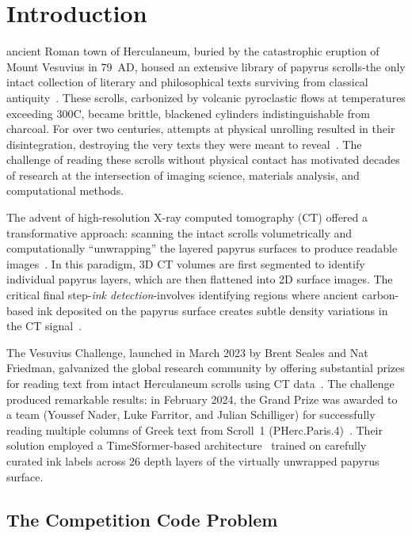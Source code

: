 \section{Introduction}
\label{sec:introduction}

 ancient Roman town of Herculaneum, buried by the catastrophic eruption of Mount Vesuvius in 79~AD, housed an extensive library of papyrus scrolls-the only intact collection of literary and philosophical texts surviving from classical antiquity~\cite{parsons1936}. These scrolls, carbonized by volcanic pyroclastic flows at temperatures exceeding 300\textdegree C, became brittle, blackened cylinders indistinguishable from charcoal. For over two centuries, attempts at physical unrolling resulted in their disintegration, destroying the very texts they were meant to reveal~\cite{janko2002herculaneum}. The challenge of reading these scrolls without physical contact has motivated decades of research at the intersection of imaging science, materials analysis, and computational methods.

The advent of high-resolution X-ray computed tomography (CT) offered a transformative approach: scanning the intact scrolls volumetrically and computationally ``unwrapping'' the layered papyrus surfaces to produce readable images~\cite{seales2005digital, seales2023educelab}. In this paradigm, 3D CT volumes are first segmented to identify individual papyrus layers, which are then flattened into 2D surface images. The critical final step-\emph{ink detection}-involves identifying regions where ancient carbon-based ink deposited on the papyrus surface creates subtle density variations in the CT signal~\cite{mocella2015revealing, liu2024ink}.

The Vesuvius Challenge, launched in March 2023 by Brent Seales and Nat Friedman, galvanized the global research community by offering substantial prizes for reading text from intact Herculaneum scrolls using CT data~\cite{vesuvius2023challenge}. The challenge produced remarkable results: in February 2024, the Grand Prize was awarded to a team (Youssef Nader, Luke Farritor, and Julian Schilliger) for successfully reading multiple columns of Greek text from Scroll~1 (PHerc.Paris.4)~\cite{nader2024gp, farritor2023first}. Their solution employed a TimeSformer-based architecture~\cite{bertasius2021timesformer} trained on carefully curated ink labels across 26 depth layers of the virtually unwrapped papyrus surface.

\subsection{The Competition Code Problem}

